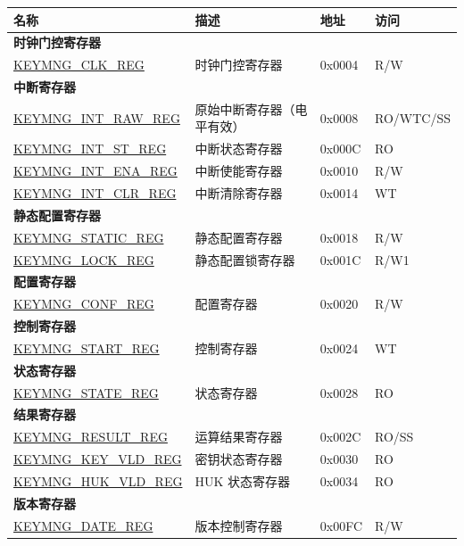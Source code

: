 \begin{longtable}{ | p{6cm} | p{7.2cm} | p{1.3cm} | p{1cm} | }
\hline\rowcolor{lightgray}
\textbf{名称} & \textbf{描述} &  \textbf{地址} & \textbf{访问} \\ \hline
\endhead
\multicolumn{4}{|l|}{\textbf{时钟门控寄存器}} \\ \hline
\hyperref[regdesc:KEYMNGCLKREG]{KEYMNG\_CLK\_REG} & 时钟门控寄存器 & 0x0004 & R/W \\ \hline
\multicolumn{4}{|l|}{\textbf{中断寄存器}} \\ \hline
\hyperref[regdesc:KEYMNGINTRAWREG]{KEYMNG\_INT\_RAW\_REG} & 原始中断寄存器（电平有效） & 0x0008 & RO/WTC/SS \\ \hline
\hyperref[regdesc:KEYMNGINTSTREG]{KEYMNG\_INT\_ST\_REG} & 中断状态寄存器 & 0x000C & RO \\ \hline
\hyperref[regdesc:KEYMNGINTENAREG]{KEYMNG\_INT\_ENA\_REG} & 中断使能寄存器 & 0x0010 & R/W \\ \hline
\hyperref[regdesc:KEYMNGINTCLRREG]{KEYMNG\_INT\_CLR\_REG} & 中断清除寄存器 & 0x0014 & WT \\ \hline
\multicolumn{4}{|l|}{\textbf{静态配置寄存器}} \\ \hline
\hyperref[regdesc:KEYMNGSTATICREG]{KEYMNG\_STATIC\_REG} & 静态配置寄存器 & 0x0018 & R/W \\ \hline
\hyperref[regdesc:KEYMNGLOCKREG]{KEYMNG\_LOCK\_REG} & 静态配置锁寄存器  & 0x001C & R/W1 \\ \hline
\multicolumn{4}{|l|}{\textbf{配置寄存器}} \\ \hline
\hyperref[regdesc:KEYMNGCONFREG]{KEYMNG\_CONF\_REG} & 配置寄存器  & 0x0020 & R/W \\ \hline
\multicolumn{4}{|l|}{\textbf{控制寄存器 }} \\ \hline
\hyperref[regdesc:KEYMNGSTARTREG]{KEYMNG\_START\_REG} & 控制寄存器  & 0x0024 & WT \\ \hline
\multicolumn{4}{|l|}{\textbf{状态寄存器}} \\ \hline
\hyperref[regdesc:KEYMNGSTATEREG]{KEYMNG\_STATE\_REG} & 状态寄存器 & 0x0028 & RO \\ \hline
\multicolumn{4}{|l|}{\textbf{结果寄存器}} \\ \hline
\hyperref[regdesc:KEYMNGRESULTREG]{KEYMNG\_RESULT\_REG} & 运算结果寄存器 & 0x002C & RO/SS \\ \hline
\hyperref[regdesc:KEYMNGKEYVLDREG]{KEYMNG\_KEY\_VLD\_REG} & 密钥状态寄存器 & 0x0030 & RO \\ \hline
\hyperref[regdesc:KEYMNGHUKVLDREG]{KEYMNG\_HUK\_VLD\_REG} & HUK 状态寄存器 & 0x0034 & RO \\ \hline
\multicolumn{4}{|l|}{\textbf{版本寄存器}} \\ \hline
\hyperref[regdesc:KEYMNGDATEREG]{KEYMNG\_DATE\_REG} & 版本控制寄存器 & 0x00FC & R/W \\ \hline
\end{longtable}